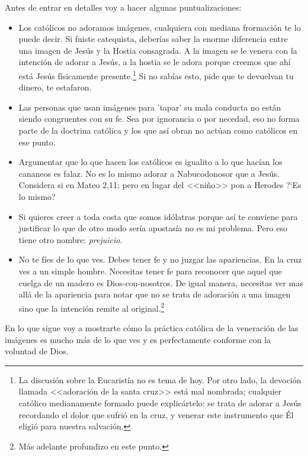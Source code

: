 \documentclass{article}
\begin{document}
\noindent
Antes de entrar en detalles voy a hacer algunas puntualizaciones:

\begin{itemize}
\item Los cat\'olicos no adoramos im\'agenes, cualquiera con mediana frormaci\'on te lo puede decir. Si fuiste catequista, deber\'{i}as saber la enorme diferencia entre una imagen de Jes\'us y la Hostia consagrada. A la imagen se le venera con la intenci\'on de adorar a Jes\'us, a la hostia se le adora porque creemos que ah\'{i} est\'a Jes\'us f\'{i}sicamente presente.\footnote{La discusi\'on sobre la Eucarist\'{i}a no es tema de hoy. Por otro lado, la devoci\'on llamada <<adoraci\'on de la santa cruz>> est\'a mal nombrada; cualquier cat\'olico medianamente formado puede explic\'artelo: se trata de adorar a Jes\'us recordando el dolor que sufri\'o en la cruz, y venerar este instrumento que \'El eligi\'o para nuestra salvaci\'on.} Si no sab\'{i}as esto, pide que te devuelvan tu dinero, te estafaron.

\item Las personas que usan im\'agenes para 'tapar' su mala conducta no est\'an siendo congruentes con su fe. Sea por ignorancia o por necedad, eso no forma parte de la doctrina cat\'olica y los que as\'{i} obran no act\'uan como cat\'olicos en ese punto.

\item Argumentar que lo que hacen los cat\'olicos es igualito a lo que hac\'{i}an los cananeos es falaz. No es lo mismo adorar a Nabucodonosor que a Jes\'us. Considera si en Mateo 2,11; pero en lugar del <<ni\~no>> pon a Herodes ?`Es lo mismo?

\item Si quieres creer a toda costa que somos id\'olatras porque as\'{i} te conviene para justificar lo que de otro modo ser\'{i}a apostas\'{i}a no es mi problema. Pero eso tiene otro nombre: \emph{prejuicio}.

\item No te f\'{i}es de lo que ves. Debes tener fe y no juzgar las apariencias. En la cruz ves a un simple hombre. Necesitas tener fe para reconocer que aquel que cuelga de un madero es Dios-con-nosotros. De igual manera, necesitas ver mas all\'a de la apariencia para notar que no se trata de adoraci\'on a una imagen sino que la intenci\'on remite al original.\footnote{M\'as adelante profundizo en este punto.}
\end{itemize}

\noindent
En lo que sigue voy a mostrarte c\'omo la pr\'actica cat\'olica de la veneraci\'on de las im\'agenes es mucho m\'as de lo que ves y es perfectamente conforme con la voluntad de Dios.
\end{document}
